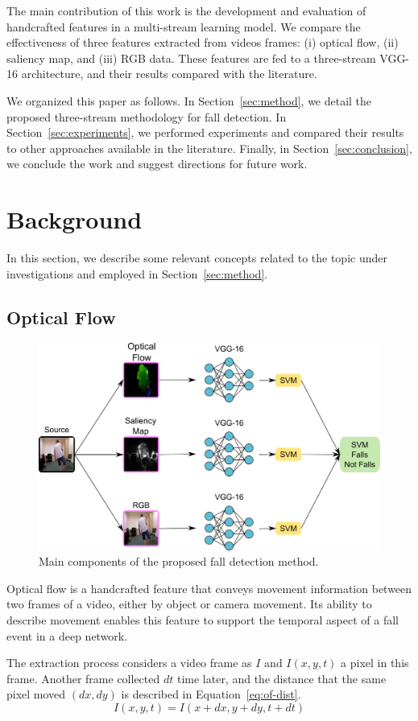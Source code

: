 \documentclass[10pt, conference, compsocconf]{IEEEtran}
\begin{document}
The main contribution of this work is the development and evaluation of handcrafted features in a multi-stream learning model. We compare the effectiveness of three features extracted from videos frames: (i) optical flow, (ii) saliency map, and (iii) RGB data. These features are fed to a three-stream VGG-16 architecture, and their results compared with the literature.

We organized this paper as follows. In Section~\ref{sec:method}, we detail the proposed three-stream methodology for fall detection. In Section~\ref{sec:experiments}, we performed experiments and compared their results to other approaches available in the literature. Finally, in Section~\ref{sec:conclusion}, we conclude the work and suggest directions for future work.

\section{Background}
\label{background}

In this section, we describe some relevant concepts related to the topic under investigations and employed in Section~\ref{sec:method}.

\subsection{Optical Flow}
\label{sec:opticalflow}

\begin{figure}[!htb]
\centerline{\includegraphics[width=0.57\linewidth]{figures/overview.png}}
\caption{Main components of the proposed fall detection method.}
\label{fig:overview}
\end{figure}

Optical flow is a handcrafted feature that conveys movement information between two frames of a video, either by object or camera movement. Its ability to describe movement enables this feature to support the temporal aspect of a fall event in a deep network.

The extraction process considers a video frame as $I$ and $I(x, y, t)$ a pixel in this frame. Another frame collected $dt$ time later, and the distance that the same pixel moved $(dx, dy)$ is described in Equation~\ref{eq:of-dist}.
\begin{equation}
\label{eq:of-dist}
I(x, y, t)=I(x+dx, y+dy, t+dt)
\end{equation}
\end{document}
